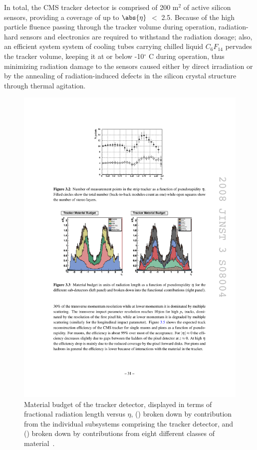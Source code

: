 In total, the CMS tracker detector is comprised of 200 m$^{2}$ of active silicon sensors, providing a coverage of up to $\abs{\eta}$ $<$ 2.5. Because of the high particle fluence passing through the tracker volume during operation, radiation-hard sensors and electronics are required to withstand the radiation dosage; also, an efficient system system of cooling tubes carrying chilled liquid $C_{6}F_{14}$ pervades the tracker volume, keeping it at or below -10$^{\circ}$ C during operation, thus minimizing radiation damage to the sensors caused either by direct irradiation or by the annealing of radiation-induced defects in the silicon crystal structure through thermal agitation.

\begin{figure}[hbtp]
  \begin{center}
    \includegraphics[width=2.4\cmsFigWidth]{figures/cms-tracker-matbudg}
    \caption{Material budget of the tracker detector, displayed in terms of fractional radiation length versus $\eta$, (\cmsLeft) broken down by contribution from the individual subsystems comprising the tracker detector, and (\cmsRight) broken down by contributions from eight different classes of material~\cite{Dominguez:1481838}.}
    \label{fig:cms-tracker-matbudg}
  \end{center}
\end{figure}

